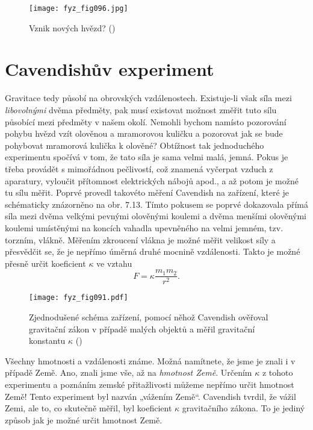{    \begin{figure}[ht!]  %
      \centering
      \texttt{[image: fyz\_fig096.jpg]}
      \caption{Vznik nových hvězd? (\cite[s.~101]{Feynman01})}
      \label{fyz:fig096}
    \end{figure}
    
  \section{Cavendishův experiment}
    Gravitace tedy působí na obrovských vzdálenostech. Existuje-li však síla mezi 
    \emph{libovolnými} dvěma předměty, pak musí existovat možnost změřit tuto sílu působící mezi 
    předměty v našem okolí. Nemohli bychom namísto pozorování pohybu hvězd vzít olověnou a 
    mramorovou kuličku a pozorovat jak se bude pohybovat mramorová kulička k olověné? Obtížnost tak 
    jednoduchého experimentu spočívá v tom, že tato síla je sama velmi malá, jemná. Pokus je třeba 
    provádět s mimořádnou pečlivostí, což znamená vyčerpat vzduch z aparatury, vyloučit přítomnost 
    elektrických nábojů apod., a až potom je možné tu sílu měřit. Poprvé provedl takovéto měření 
    Cavendish na zařízení, které je schématicky znázorněno na obr. 7.13. Tímto pokusem se poprvé 
    dokazovala přímá síla mezi dvěma velkými pevnými olověnými koulemi a dvěma menšími olověnými 
    koulemi umístěnými na koncích vahadla upevněného na velmi jemném, tzv. torzním, vlákně. Měřením 
    zkroucení vlákna je možné měřit velikost síly a přesvědčit se, že je nepřímo úměrná druhé 
    mocnině vzdálenosti. Takto je možné přesně určit koeficient \(\kappa\) ve vztahu
    \begin{equation}\label{FYZ:eq094}
      F = \kappa\frac{m_1m_2}{r^2}.
    \end{equation}
    
    \begin{figure}[ht!]  %
      \centering
      \texttt{[image: fyz\_fig091.pdf]}
      \caption{Zjednodušené schéma zařízení, pomocí něhož Cavendish ověřoval gravitační zákon v 
               případě malých objektů a měřil gravitační konstantu \(\kappa\)
               (\cite[s.~102]{Feynman01})}
      \label{fyz:fig091}
    \end{figure}
    Všechny hmotnosti a vzdálenosti známe. Možná namítnete, že jsme je znali i v případě Země. Ano, 
    znali jsme vše, až na \emph{hmotnost Země}. Určením \(\kappa\) z tohoto experimentu a poznáním 
    zemské přitažlivosti můžeme nepřímo určit hmotnost Země! Tento experiment byl nazván „vážením 
    Země“. Cavendish tvrdil, že vážil Zemi, ale to, co skutečně měřil, byl koeficient \(\kappa\) 
    gravitačního zákona. To je jediný způsob jak je možné určit hmotnost Země.
    
}

